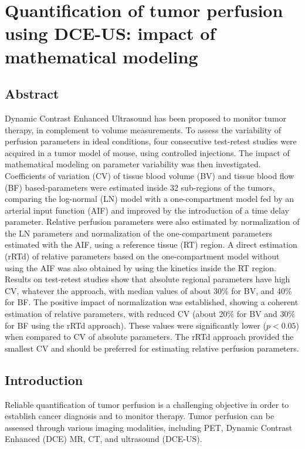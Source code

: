 \chapter{Quantification of tumor perfusion using DCE-US: impact of mathematical modeling}\label{chapter:PMB}

\section{Abstract}
Dynamic Contrast Enhanced Ultrasound has been proposed to monitor tumor therapy, in complement to volume measurements. To assess the variability of perfusion parameters in  ideal conditions, four consecutive test-retest studies were acquired in a tumor model of mouse, using controlled injections. The impact of mathematical modeling on parameter variability was then investigated. Coefficients of variation (CV) of tissue blood volume (BV) and tissue blood flow (BF) based-parameters were estimated inside 32 sub-regions of the tumors, comparing the log-normal (LN) model with a one-compartment model fed by an arterial input function (AIF) and improved by the introduction of a time delay parameter. Relative perfusion parameters were also estimated by normalization of the LN parameters and normalization of the one-compartment parameters estimated with the AIF, using a reference tissue (RT) region. A direct estimation (rRTd) of relative parameters  based on the one-compartment model without using the AIF was also obtained by using the kinetics inside the RT region.  Results on test-retest studies show that absolute regional parameters have high CV, whatever the approach, with median values of about 30\% for BV, and 40\% for BF. The positive impact of normalization was established, showing a coherent estimation of relative parameters, with reduced CV (about 20\% for BV and 30\% for BF using the rRTd approach). These values were significantly lower ($p<0.05$) when compared to CV of absolute parameters. The rRTd approach provided the smallest CV and should be preferred for estimating relative perfusion parameters. 

\section{Introduction}
Reliable quantification of tumor perfusion is a challenging objective in order to establish cancer diagnosis and to monitor therapy. Tumor perfusion can be assessed through various imaging modalities, including PET, Dynamic Contrast Enhanced (DCE) MR, CT, and ultrasound (DCE-US).

